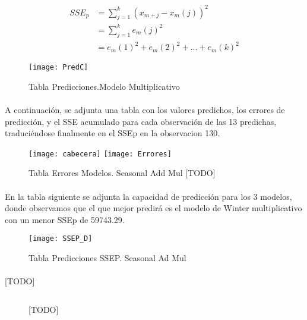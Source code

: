 \documentclass[a4paper, spanish]{article}
\begin{document}
    \begin{align*}
      SSE_p
      &= \sum_{j = 1} ^ k (x_{m + j} - x_{m}(j)) ^ 2 \\
      &= \sum_{j = 1} ^ k e_m(j) ^ 2 \\
      &= e_m(1) ^ 2 + e_m(2) ^ 2 + ... + e_m(k) ^ 2
    \end{align*}

    \begin{figure}[h!]
      \centering
      \texttt{[image: PredC]}
      \caption{Tabla Predicciones.Modelo Multiplicativo}
      \label{}
    \end{figure}

    \paragraph{}
    A continuación, se adjunta una tabla con los valores predichos, los errores de predicción, y el SSE acumulado para cada observación de las 13 predichas, traduciéndose finalmente en el SSEp en la observacion 130.

    \begin{figure}[h!]
      \centering
      \texttt{[image: cabecera]}
      \texttt{[image: Errores]}
      \caption{Tabla Errores Modelos. Seasonal Add Mul [TODO]}
      \label{}
    \end{figure}

    \paragraph{}
    En la tabla siguiente se adjunta la capacidad de predicción para los 3 modelos, donde observamos que el que mejor predirá
    es el modelo de Winter multiplicativo con un menor SSEp de 59743.29.

    \begin{figure}[h!]
      \centering
      \texttt{[image: SSEP\_D]}
      \caption{Tabla Predicciones SSEP. Seasonal Ad Mul}
      \label{}
    \end{figure}

    \paragraph{}
    [TODO]

    \begin{figure}[h!]
      \centering
      \inputminted{SAS}{./res/code/d.sas}
      \caption{[TODO]}
      \label{}
    \end{figure}
\end{document}
